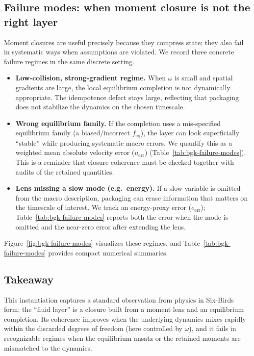 \documentclass[11pt]{article}
\begin{document}
\subsection{Failure modes: when moment closure is not the right layer}
Moment closures are useful precisely because they compress state; they also fail in systematic ways when assumptions are violated. We record three concrete failure regimes in the same discrete setting.

\begin{itemize}
  \item \textbf{Low-collision, strong-gradient regime.} When $\omega$ is small and spatial gradients are large, the local equilibrium completion is not dynamically appropriate. The idempotence defect stays large, reflecting that packaging does not stabilize the dynamics on the chosen timescale.

  \item \textbf{Wrong equilibrium family.} If the completion uses a mis-specified equilibrium family (a biased/incorrect $f_{\mathrm{eq}}$), the layer can look superficially ``stable'' while producing systematic macro errors. We quantify this as a weighted mean absolute velocity error ($u_{\mathrm{err}}$) (Table~\ref{tab:bgk-failure-modes}). This is a reminder that closure coherence must be checked together with audits of the retained quantities.

  \item \textbf{Lens missing a slow mode (e.g.\ energy).} If a slow variable is omitted from the macro description, packaging can erase information that matters on the timescale of interest. We track an energy-proxy error ($e_{\mathrm{err}}$); Table~\ref{tab:bgk-failure-modes} reports both the error when the mode is omitted and the near-zero error after extending the lens.
\end{itemize}

Figure~\ref{fig:bgk-failure-modes} visualizes these regimes, and Table~\ref{tab:bgk-failure-modes} provides compact numerical summaries.

\subsection{Takeaway}
This instantiation captures a standard observation from physics in Six-Birds form: the ``fluid layer'' is a closure built from a moment lens and an equilibrium completion. Its coherence improves when the underlying dynamics mixes rapidly within the discarded degrees of freedom (here controlled by $\omega$), and it fails in recognizable regimes when the equilibrium ansatz or the retained moments are mismatched to the dynamics.
\end{document}
